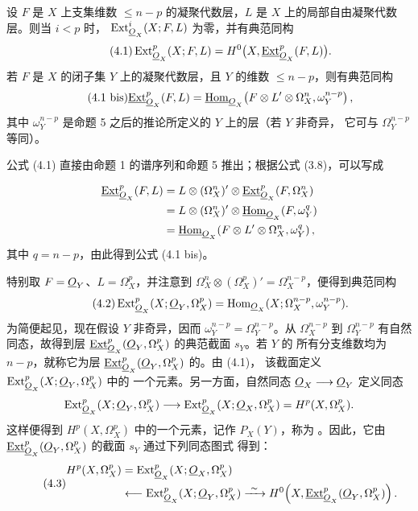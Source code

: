  设 $F$ 是 $X$ 上支集维数 $\leq n-p$ 的凝聚代数层，$L$
是 $X$ 上的局部自由凝聚代数层。则当 $i<p$ 时，
$\operatorname{Ext}_{\underline{O}_X}^{i}(X;F,L)$ 为零，并有典范同构
\begin{equation}\tag{4.1}
  \operatorname{Ext}_{\underline{O}_X}^{p}(X;F,L)
  =H^{0}\bigl(X,\underline{\operatorname{Ext}}_{\underline{O}_X}^{p}(F,L)\bigr).
\end{equation}
若 $F$ 是 $X$ 的闭子集 $Y$ 上的凝聚代数层，且 $Y$ 的维数
$\leq n-p$，则有典范同构
\begin{equation}\tag{4.1 bis}
  \underline{\operatorname{Ext}}_{\underline{O}_X}^{p}(F,L)
  =\underline{\operatorname{Hom}}_{\underline{O}_X}\!\left(
    F\otimes L'\otimes\Omega_X^{n},\omega_Y^{n-p}
  \right),
\end{equation}
其中 $\omega_Y^{n-p}$ 是命题 5 之后的推论所定义的 $Y$ 上的层（若 $Y$ 非奇异，
它可与 $\Omega_Y^{n-p}$ 等同）。

公式 (4.1) 直接由命题 1 的谱序列和命题 5 推出；根据公式 (3.8)，可以写成

\begin{align*}
\underline{\operatorname{Ext}}_{\underline{O}_X}^{p}(F,L)
&=L\otimes(\Omega_X^{n})'\otimes
  \underline{\operatorname{Ext}}_{\underline{O}_X}^{p}(F,\Omega_X^{n})\\
&=L\otimes(\Omega_X^{n})'\otimes
  \underline{\operatorname{Hom}}_{\underline{O}_X}(F,\omega_Y^{q})\\
&=\underline{\operatorname{Hom}}_{\underline{O}_X}\!\left(
  F\otimes L'\otimes\Omega_X^{n},\omega_Y^{q}\right),
\end{align*}
其中 $q=n-p$，由此得到公式 (4.1 bis)。

特别取 $F=\underline{O}_Y$、$L=\Omega_X^{p}$，并注意到
$\Omega_X^{n}\otimes(\Omega_X^{p})'=\Omega_X^{n-p}$，便得到典范同构
\begin{equation}\tag{4.2}
  \operatorname{Ext}_{\underline{O}_X}^{p}(X;\underline{O}_Y,\Omega_X^{p})
  =\operatorname{Hom}_{\underline{O}_X}
  (X;\Omega_X^{n-p},\omega_Y^{n-p}).
\end{equation}
为简便起见，现在假设 $Y$ 非奇异，因而
$\omega_Y^{n-p}=\Omega_Y^{n-p}$。从 $\Omega_X^{n-p}$ 到
$\Omega_Y^{n-p}$ 有自然同态，故得到层
$\underline{\operatorname{Ext}}_{\underline{O}_X}^{p}(\underline{O}_Y,\Omega_X^{p})$ 的典范截面 $s_Y$。若 $Y$ 的
所有分支维数均为 $n-p$，就称它为层
$\underline{\operatorname{Ext}}_{\underline{O}_X}^{p}(\underline{O}_Y,\Omega_X^{p})$ 的。由 (4.1)，
该截面定义 $\operatorname{Ext}_{\underline{O}_X}^{p}(X;\underline{O}_Y,\Omega_X^{p})$ 中的
一个元素。另一方面，自然同态 $\underline{O}_X\longrightarrow\underline{O}_Y$ 定义同态
\[
  \operatorname{Ext}_{\underline{O}_X}^{p}(X;\underline{O}_Y,\Omega_X^{p})
  \longrightarrow
  \operatorname{Ext}_{\underline{O}_X}^{p}(X;\underline{O}_X,\Omega_X^{p})
  =H^{p}(X,\Omega_X^{p}).
\]
这样便得到 $H^{p}(X,\Omega_X^{p})$ 中的一个元素，记作 $P_X(Y)$，称为
。因此，它由
$\underline{\operatorname{Ext}}_{\underline{O}_X}^{p}(\underline{O}_Y,\Omega_X^{p})$ 的截面 $s_Y$ 通过下列同态图式
得到：
\begin{equation}\tag{4.3}
\begin{aligned}
H^{p}(X,\Omega_X^{p})
&=\operatorname{Ext}_{\underline{O}_X}^{p}(X;\underline{O}_X,\Omega_X^{p})\\
&\longleftarrow\operatorname{Ext}_{\underline{O}_X}^{p}(X;\underline{O}_Y,\Omega_X^{p})
\xrightarrow{\ \sim\ }
H^{0}\!\left(X,\underline{\operatorname{Ext}}_{\underline{O}_X}^{p}(\underline{O}_Y,\Omega_X^{p})\right).
\end{aligned}
\end{equation}

